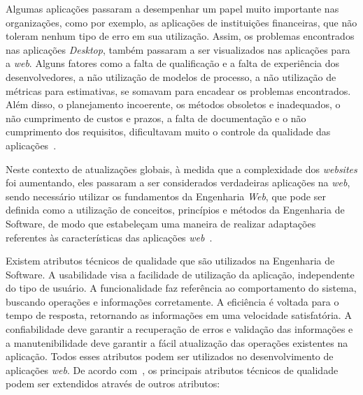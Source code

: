 Algumas aplicações passaram a desempenhar um papel muito importante nas organizações, como por exemplo, as aplicações de instituições financeiras, que não toleram nenhum tipo de erro em sua utilização. Assim, os problemas encontrados nas aplicações \textit{Desktop}, também passaram a ser visualizados nas aplicações para a \textit{web}. Alguns fatores como a falta de qualificação e a falta de experiência dos desenvolvedores, a não utilização de modelos de processo, a não utilização de métricas para estimativas, se somavam para encadear os problemas encontrados. Além disso, o planejamento incoerente, os métodos obsoletos e inadequados, o não cumprimento de custos e prazos, a falta de documentação e o não cumprimento dos requisitos, dificultavam muito o controle da qualidade das aplicações~\cite{peruch-pg07}.               

Neste contexto de atualizações globais, à medida que a complexidade dos \textit{websites} foi aumentando, eles passaram a ser considerados verdadeiras aplicações na \textit{web}, sendo necessário utilizar os fundamentos da Engenharia \textit{Web}, que pode ser definida como a utilização de conceitos, princípios e métodos da Engenharia de Software, de modo que estabeleçam uma maneira de realizar adaptações referentes às características das aplicações \textit{web}~\cite{beder:ew12}.

Existem atributos técnicos de qualidade que são utilizados na Engenharia de Software. A usabilidade visa a facilidade de utilização da aplicação, independente do tipo de usuário. A funcionalidade faz referência ao comportamento do sistema, buscando operações e informações corretamente. A eficiência é voltada para o tempo de resposta, retornando as informações em uma velocidade satisfatória. A confiabilidade deve garantir a recuperação de erros e validação das informações e a manutenibilidade deve garantir a fácil atualização das operações existentes na aplicação. Todos esses atributos podem ser utilizados no desenvolvimento de aplicações \textit{web}. De acordo com~, os principais atributos técnicos de qualidade podem ser extendidos através de outros atributos: 

